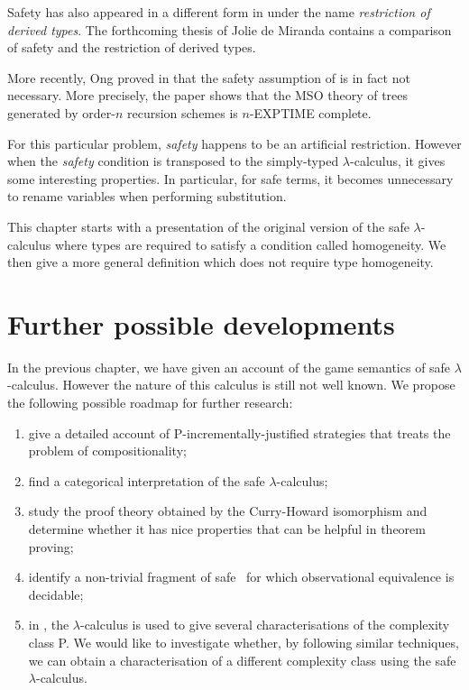 Safety has also appeared in a different form in \cite{Dam82} under
the name \emph{restriction of derived types}. The forthcoming thesis
of Jolie de Miranda \citep{demirandathesis} contains a comparison of
safety and the restriction of derived types.

More recently, Ong proved in \cite{OngLics2006} that the safety
assumption of \cite{KNU02} is in fact not necessary. More precisely,
the paper shows that the MSO theory of trees generated by order-$n$
recursion schemes is $n$-EXPTIME complete.

For this particular problem, \emph{safety} happens to be an
artificial restriction. However when the \emph{safety} condition is
transposed to the simply-typed $\lambda$-calculus, it gives some
interesting properties. In particular, for safe terms, it becomes
unnecessary to rename variables when performing substitution.

This chapter starts with a presentation of the original version of
the safe $\lambda$-calculus where types are required to satisfy a
condition called homogeneity. We then give a more general definition
which does not require type homogeneity.
















\chapter{Further possible developments}

In the previous chapter, we have given an account of the game
semantics of safe $\lambda$-calculus. However the nature of this
calculus is still not well known. We propose the following possible
roadmap for further research:
\begin{enumerate}
\item give a detailed account of
P-incrementally-justified strategies that treats the problem of compositionality;
\item find a categorical interpretation of the safe $\lambda$-calculus;
\item study the proof theory obtained by the Curry-Howard isomorphism and determine whether it has nice properties that can be helpful in theorem proving;
\item identify a non-trivial fragment of safe \ialgol\ for which observational equivalence is decidable;
\item in \cite{DBLP:conf/tlca/LeivantM93}, the $\lambda$-calculus is used to
give several characterisations of the complexity class P. We would
like to investigate whether, by following similar techniques, we can
obtain a characterisation of a different complexity class using the
safe $\lambda$-calculus.
\end{enumerate}


